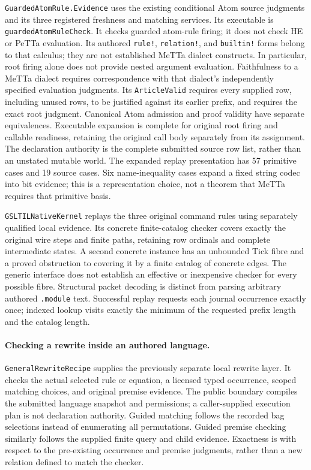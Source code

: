 \documentclass[11pt]{article}
\newcommand{\code}[1]{\nolinkurl{#1}}
\begin{document}
\code{GuardedAtomRule.Evidence} uses the existing conditional Atom source
judgments and its three registered freshness and matching services.
Its executable is \code{guardedAtomRuleCheck}. It checks guarded atom-rule
firing; it does not check HE or PeTTa evaluation. Its authored \code{rule!},
\code{relation!}, and \code{builtin!} forms belong to that calculus;
they are not established MeTTa dialect constructs. In particular, root
firing alone does not provide nested argument evaluation. Faithfulness to
a MeTTa dialect requires correspondence with that dialect's independently
specified evaluation judgments.
Its \code{ArticleValid} requires every supplied row, including unused rows,
to be justified against its earlier prefix, and requires the exact root
judgment. Canonical Atom admission and proof validity have separate
equivalences. Executable expansion is complete for original root firing
and callable readiness, retaining the original call body separately from
its assignment. The declaration authority is the complete submitted source
row list, rather than an unstated mutable world. The expanded replay
presentation has 57 primitive cases and 19 source cases. Six name-inequality
cases expand a fixed string codec into bit evidence; this is a representation
choice, not a theorem that MeTTa requires that primitive basis.

\code{GSLTILNativeKernel} replays the three original command rules using
separately qualified local evidence. Its concrete finite-catalog checker
covers exactly the original wire steps and finite paths, retaining row
ordinals and complete intermediate states. A second concrete instance has
an unbounded Tick fibre and a proved obstruction to covering it by a finite
catalog of concrete edges. The generic interface does not establish an
effective or inexpensive checker for every possible fibre. Structural
packet decoding is distinct from parsing arbitrary authored \code{.module}
text. Successful replay requests each journal occurrence exactly once;
indexed lookup visits exactly the minimum of the requested prefix length
and the catalog length.

\paragraph{Checking a rewrite inside an authored language.}
\code{GeneralRewriteRecipe} supplies the previously separate local
rewrite layer. It checks the actual selected rule or equation, a licensed
typed occurrence, scoped matching choices, and original premise evidence.
The public boundary compiles the submitted language snapshot and permissions;
a caller-supplied execution plan is not declaration authority. Guided matching
follows the recorded bag selections instead of enumerating all permutations.
Guided premise checking similarly follows the supplied finite query and child
evidence. Exactness is with respect to the pre-existing occurrence and premise
judgments, rather than a new relation defined to match the checker.
\end{document}
